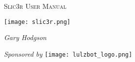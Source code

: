 \date {}
\thispagestyle{empty}
\begingroup
\centering 

\begin{center}
{\Huge \scshape Slic3r User Manual}

\end{center}

\vspace{40mm}

\begin{center}
\texttt{[image: slic3r.png]}

\vspace{20mm}

{\large \itshape Gary Hodgson}

\vspace{20mm}

{\large \itshape Sponsored by }
\texttt{[image: lulzbot\_logo.png]}

\end{center}
\endgroup

